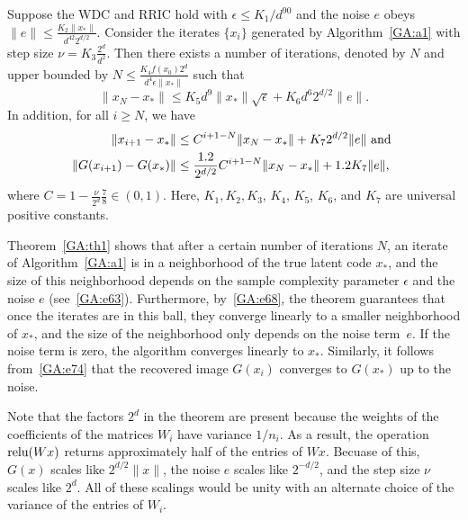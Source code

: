 \begin{theorem} \label{GA:th1}
Suppose the WDC and RRIC
hold with $\epsilon \leq K_1 / d^{90}$ and the noise $e$ obeys $\|e\| \leq \frac{K_2 \|x_*\|}{d^{42} 2^{d/2}}$. Consider the iterates $\{x_i\}$ generated by Algorithm~\ref{GA:a1} with step size $\nu = K_3 \frac{2^d}{d^2}$. Then there exists a number of iterations, denoted by $N$ and  upper bounded by $N \leq \frac{K_4 f(x_0) 2^d}{d^4 \epsilon \|x_*\|}$ such that
\begin{equation}\label{GA:e63}
\|x_N - x_*\| \leq K_5 d^9 \|x_*\| \sqrt{\epsilon} + K_6 d^6 2^{d/2} \|e\|.
\end{equation}
In addition, for all $i \geq N$, we have
\begin{align}
\|x_{i + 1} - x_*\| &\leq C^{i + 1 - N} \|x_N - x_*\| + K_7 2^{d/2} \|e\| \hbox{ and }  \label{GA:e68} \\
\|G(x_{i + 1}) - G(x_*)\| &\leq \frac{1.2}{2^{d/2}} C^{i + 1 - N} \|x_N - x_*\| + 1.2 K_7 \|e\|, \label{GA:e74}
\end{align}
where $C = 1 - \frac{\nu}{2^d} \frac{7}{8} \in (0, 1)$.
Here, $K_1, K_2, K_3$, $K_4$, $K_5$, $K_6$, and $K_7$ are universal positive constants.
\end{theorem}

Theorem~\ref{GA:th1} shows that after a certain number of iterations $N$, an iterate of Algorithm~\ref{GA:a1} is in a neighborhood of the true latent code $x_*$, and the size of this neighborhood depends on the sample complexity parameter $\epsilon$ and the noise $e$ (see~\eqref{GA:e63}). Furthermore, by~\eqref{GA:e68}, the theorem  guarantees that once the iterates are in this ball, they converge linearly to a smaller neighborhood of $x_*$, and the size of the neighborhood only depends on the noise term~$e$. If the noise term is zero, the algorithm converges linearly to $x_*$. Similarly, it follows from~\eqref{GA:e74} that the recovered image $G(x_i)$ converges to $G(x_*)$ up to the noise.

Note that the factors $2^d$ in the theorem are present because the weights of the coefficients of the matrices $W_i$ have variance $1 / n_i$. As a result, the operation $\operatorname{\mathrm{relu}}(W x)$ returns approximately half of the entries of $W x$. Becuase of this, $G(x)$ scales like $2^{d / 2} \|x\|$, the noise $e$ scales like $2^{-d/2}$, and the step size $\nu$ scales like $2^d$. All of these scalings would be unity with an alternate choice of the variance of the entries of $W_i$.

